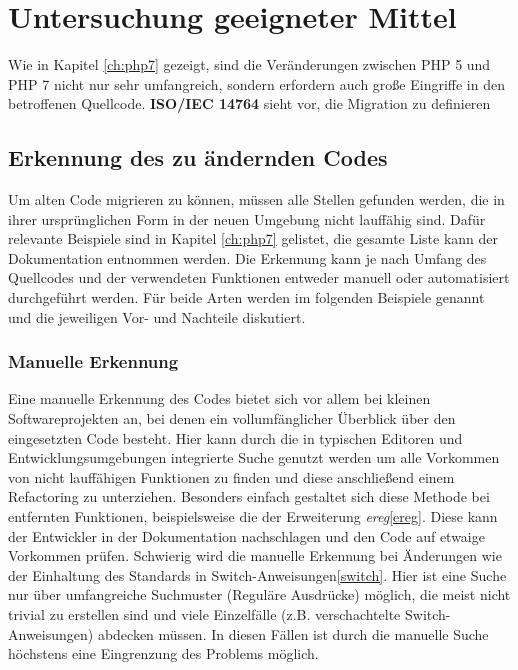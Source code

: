 \chapter{Untersuchung geeigneter Mittel}\label{ch:tools} 

Wie in Kapitel \ref{ch:php7} gezeigt, sind die Veränderungen zwischen \acs{PHP} 5 und \acs{PHP} 7 nicht nur sehr umfangreich, sondern erfordern auch große Eingriffe 
in den betroffenen Quellcode. \textbf{ISO/IEC 14764} sieht vor, die Migration zu definieren

\section{Erkennung des zu ändernden Codes}
    Um alten Code migrieren zu können, müssen alle Stellen gefunden werden, die in ihrer ursprünglichen Form in der neuen Umgebung nicht lauffähig sind. Dafür relevante
    Beispiele sind in Kapitel \ref{ch:php7} gelistet, die gesamte Liste kann der Dokumentation entnommen werden. Die Erkennung kann je nach Umfang des Quellcodes
    und der verwendeten Funktionen entweder manuell oder automatisiert durchgeführt werden. Für beide Arten werden im folgenden Beispiele genannt und die jeweiligen
    Vor- und Nachteile diskutiert.
    \subsection{Manuelle Erkennung}
        Eine manuelle Erkennung des Codes bietet sich vor allem bei kleinen Softwareprojekten an, bei denen ein vollumfänglicher Überblick über den eingesetzten Code
        besteht. Hier kann durch die in typischen Editoren und Entwicklungsumgebungen integrierte Suche genutzt werden um alle Vorkommen von nicht lauffähigen
        Funktionen zu finden und diese anschließend einem Refactoring zu unterziehen. Besonders einfach gestaltet sich diese Methode bei entfernten Funktionen,
        beispielsweise die der Erweiterung \textit{ereg}\ref{ereg}. Diese kann der Entwickler in der Dokumentation nachschlagen und den Code auf etwaige Vorkommen prüfen.
        Schwierig wird die manuelle Erkennung bei Änderungen wie der Einhaltung des Standards in Switch-Anweisungen\ref{switch}. Hier ist eine Suche nur über umfangreiche
        Suchmuster (Reguläre Ausdrücke) möglich, die meist nicht trivial zu erstellen sind und viele Einzelfälle (z.B. verschachtelte Switch-Anweisungen) abdecken müssen.
        In diesen Fällen ist durch die manuelle Suche höchstens eine Eingrenzung des Problems möglich.
